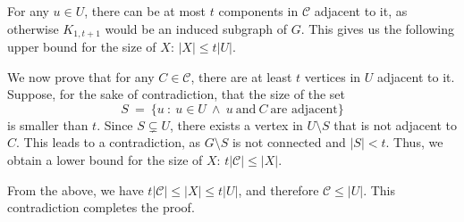 \documentclass[12pt]{article}
\begin{document}
	\medskip
	
	For any \(u \in U\), there can be at most \(t\) components in
	\(\mathcal{C}\) adjacent to it, as otherwise \(K_{1, t + 1}\) would be an
	induced subgraph of \(G\). This gives us the following upper bound for the
	size of \(X\): \(|X| \leqslant t |U|\).
	
	\medskip
	
	We now prove that for any \(C \in \mathcal{C}\), there are at least \(t\)
	vertices in \(U\) adjacent to it. Suppose, for the sake of contradiction,
	that the size of the set
	\[ S \ = \ \{u \ : \ u \in U \ \wedge \ u \ \text{and} \ C \
	\text{are adjacent}\} \]
	is smaller than \(t\). Since \(S \subsetneq U\), there exists a vertex in
	\(U \setminus S\) that is not adjacent to \(C\). This leads to a
	contradiction, as \(G \setminus S\) is not connected and \(|S| < t\). Thus,
	we obtain a lower bound for the size of \(X\): \(t |\mathcal{C}| \leqslant
	|X|\).
	
	\medskip
	
	From the above, we have \(t |\mathcal{C}| \leqslant |X| \leqslant t |U|\),
	and therefore \(\mathcal{C} \leqslant |U|\). This contradiction completes
	the proof.
\end{document}
